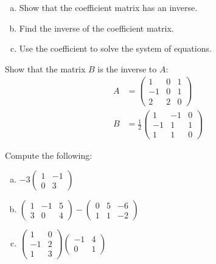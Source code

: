 \documentclass[11pt,letterpaper]{article}
\begin{document}
\begin{enumerate}[(a)]
\item Show that the coefficient matrix has an inverse.
\item Find the inverse of the coefficient matrix.
\item Use the coefficient to solve the system of equations. 
\end{enumerate}



\newpage



 Show that the matrix $B$ is the inverse to $A$:
	\[
	\begin{aligned}
	A&= \begin{pmatrix} 1 & 0 & 1 \\ -1 & 0 & 1 \\ 2 & 2 & 0 \end{pmatrix} \\[0.3cm]
	B&= \frac{1}{2} \begin{pmatrix} 1 & -1 & 0 \\ -1 & 1 & 1 \\ 1 & 1 & 0 \end{pmatrix}
	\end{aligned}
	\]



\newpage



 Compute the following:
	\begin{enumerate}[(a)]
	\item $-3 \begin{pmatrix} 1 & -1 \\ 0 & 3 \end{pmatrix}$
	\item $\begin{pmatrix} 1 & -1 & 5 \\ 3 & 0 & 4 \end{pmatrix} - \begin{pmatrix} 0 & 5 & -6 \\ 1 & 1 & -2 \end{pmatrix}$
	\item $\begin{pmatrix} 1 & 0 \\ -1 & 2 \\ 1 & 3 \end{pmatrix} \begin{pmatrix} -1 & 4 \\ 0 & 1 \end{pmatrix}$
	\end{enumerate}
\end{document}

